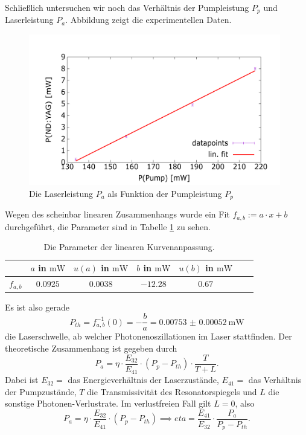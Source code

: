 \documentclass[../../../main.tex]{subfiles}
\begin{document}
    Schließlich untersuchen wir noch das Verhältnis der Pumpleistung $P_p$ und Laserleistung $P_a$. Abbildung zeigt die experimentellen Daten.

    \begin{figure}[H]
        \centering
        \includegraphics[width=11cm]{../../Bilddateien/5-1/P(NDYAG)overP(Pump).png}
        \caption{Die Laserleistung $P_a$ als Funktion der Pumpleistung $P_p$}
        \label{fig:PumpLaserLeistung}
    \end{figure}

    Wegen des scheinbar linearen Zusammenhangs wurde ein Fit $f_{a,b} := a\cdot x + b$ durchgeführt, die Parameter sind in Tabelle \ref{tab:PumpLaserLeistungFitParameter} zu sehen.

    \begin{table}[H]
        \centering
        \begin{tabular}{c|cc|cc|cc}
            \hline
             & $a$ in $\si{\m\W}$ & $u(a)$ in $\si{\m\W}$ & $b$ in $\si{\m\W}$ & $u(b)$ in $\si{\m\W}$ \\
            \hline\hline
            $f_{a, b}$ & $0.0925$ & $0.0038$ & $-12.28$ & $0.67$\\
            \hline
        \end{tabular}
        \caption{Die Parameter der linearen Kurvenanpassung.}
        \label{tab:PumpLaserLeistungFitParameter}
    \end{table}

    Es ist also gerade
    \[
        P_{th} = f^{-1}_{a, b}(0) = -\frac{b}{a} = \SI{0.00753(52)}{\m\W}
    \]
    die Laserschwelle, ab welcher Photonenoszillationen im Laser stattfinden. Der theoretische Zusammenhang ist gegeben durch 
    \[
        P_a = \eta\cdot\frac{E_{32}}{E_{41}}\cdot(P_p - P_{th})\cdot \frac{T}{T + L}.
    \]
    Dabei ist $E_{32} = $ das Energieverhältnis der Laserzustände, $E_{41}=$ das Verhältnis der Pumpzustände, $T$ die Transmissivität des Resonatorspiegels und $L$ die sonstige Photonen-Verlustrate. Im verlustfreien Fall gilt $L=0$, also 
    \[
        P_a = \eta\cdot\frac{E_{32}}{E_{41}}\cdot(P_p - P_{th}) \implies eta = \frac{E_{41}}{E_{32}}\cdot \frac{P_a}{P_p - P_{th}}.
    \] 
\end{document}
